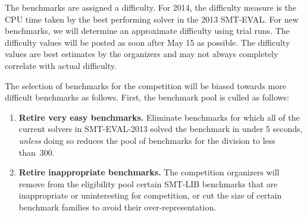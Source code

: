 \documentclass[12pt]{article}
\begin{document}

The benchmarks are assigned a difficulty. For 2014, the difficulty measure is the
CPU time taken by the best performing solver in the 2013 SMT-EVAL. 
 For new benchmarks, we will determine an approximate difficulty
using trial runs.
The difficulty values will be posted 
as soon after May 15 as possible.
The difficulty values are best estimates by the organizers and may not always completely correlate with actual difficulty.

The selection of benchmarks for the competition will be biased towards more difficult benchmarks
as follows. First, the benchmark pool is culled as follows:
\begin{enumerate}

\item \textbf{Retire very easy benchmarks.} %
  Eliminate benchmarks for which all of the current solvers in SMT-EVAL-2013
  solved the benchmark in under 5 seconds,
  \emph{unless} doing so reduces the pool of
    benchmarks for the division to less than~300.

\item \textbf{Retire inappropriate benchmarks.} %
  The competition organizers will remove from the eligibility pool
  certain SMT-LIB benchmarks that are inappropriate or uninteresting
  for competition, or cut the size of certain benchmark families to
  avoid their over-representation.

\end{enumerate}
\end{document}
